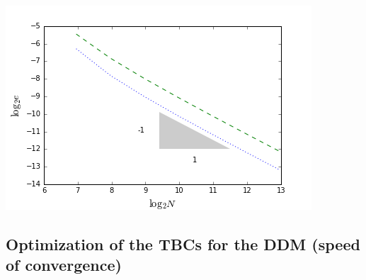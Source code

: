 
\begin{center}
	\includegraphics[scale=.5]{figures/convergenceVerification.png}
\end{center}


\subsection{Optimization of the TBCs for the DDM (speed of convergence)}

